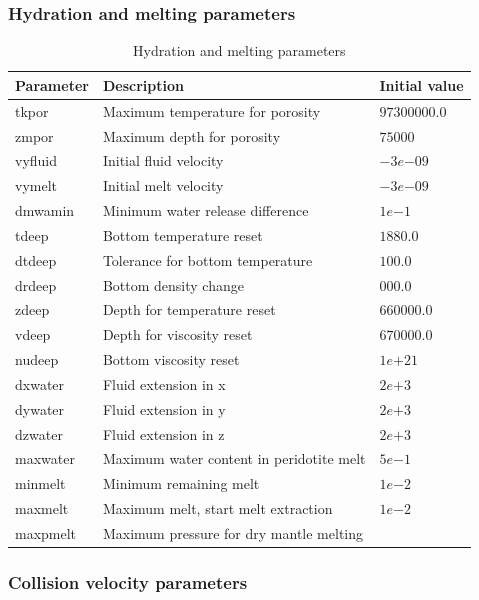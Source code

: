 \subsubsection{Hydration and melting parameters}

\begin{table}[H]
	\small
	\centering
	\begin{tabular}{l p{7cm} l}
		\toprule
		Parameter & Description & Initial value \\
		\midrule
		tkpor 		& Maximum temperature for porosity & $97300000.0$\\
		zmpor 		& Maximum depth for porosity & $75000$\\
		vyfluid 	& Initial fluid velocity & $-3e{-09}$\\
		vymelt 		& Initial melt velocity & $-3e{-09}$\\
		dmwamin 	& Minimum water release difference & $1e{-1}$\\
		tdeep 		& Bottom temperature reset & $1880.0$\\
		dtdeep 		& Tolerance for bottom temperature & $100.0$\\
		drdeep 		& Bottom density change & $000.0$\\
		zdeep 		& Depth for temperature reset & $660000.0$\\
		vdeep		& Depth for viscosity reset & $670000.0$\\
		nudeep		& Bottom viscosity reset & $1e{+21}$\\
		dxwater		& Fluid extension in x & $2e{+3}$\\
		dywater		& Fluid extension in y & $2e{+3}$\\
		dzwater		& Fluid extension in z & $2e{+3}$\\
		maxwater	& Maximum water content in peridotite melt & $5e{-1}$\\
		minmelt		& Minimum remaining melt & $1e{-2}$\\
		maxmelt		& Maximum melt, start melt extraction & $1e{-2}$\\
		maxpmelt	& Maximum pressure for dry mantle melting & \\
		\bottomrule
	\end{tabular}
	\caption{Hydration and melting parameters}
	\label{tbl:mode_melting_parameters}
\end{table}

\subsubsection{Collision velocity parameters}

